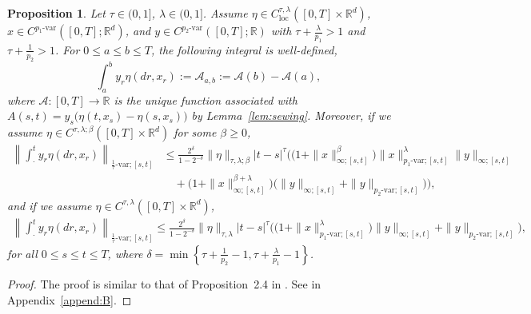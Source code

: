 \documentclass[11pt,reqno]{amsart}
\def\R{\mathbb R}
\newtheorem{proposition}{Proposition}[section]
\numberwithin{equation}{section}
\begin{document}
\begin{proposition}\label{prop:bounds}
Let $ \tau\in(0, 1]$, $ \lambda\in(0,1]$. 
Assume $\eta\in C^{\tau,\lambda}_{\mathrm{loc}}([0,T]\times \mathbb{R}^{d})$, $x\in C^{p_{1}\text{-}\mathrm{var}}([0,T];\mathbb{R}^{d})$, and $y\in C^{p_{2}\text{-}\mathrm{var}}([0,T];\mathbb{R})$ with $\tau +\frac{\lambda}{p_{1}}>1$  and $\tau + \frac{1}{p_{2}}>1$.  For $0\le a\le b\le T$, the following integral is well-defined,		
\[\int_{a}^{b} y_r \eta(dr,x_r) := \mathcal{A}_{a,b} := \mathcal A(b)-\mathcal A(a),\] 
where $\mathcal{A}:[0,T]\to \R$ is the unique function associated with $A(s,t)= y_s\big(\eta(t,x_s) - \eta(s,x_s)\big)$ by Lemma~\ref{lem:sewing}. Moreover, if we assume $\eta\in C^{\tau,\lambda;\beta}([0,T]\times\mathbb{R}^{d})$ for some $\beta\ge 0$, 
\begin{equation}\label{e:p-var2}
\begin{aligned}
\left\|\int_{\cdot}^{t}y_{r}\eta(dr,x_{r})\right\|_{\frac{1}{\tau}\text{-}\mathrm{var};[s,t]}&\le \frac{2^{\delta}}{1-2^{-\delta}}\|\eta\|_{\tau,\lambda;\beta} |t-s|^{\tau} \bigg(\Big(1+\|x\|^{\beta}_{\infty;[s,t]}\Big)\|x\|^{\lambda}_{p_{1}\text{-}\mathrm{var};[s,t]}\|y\|_{\infty;[s,t]}\\ 
&\quad +  \Big(1+\|x\|^{\beta+\lambda}_{\infty;[s,t]}\Big)\Big(\|y\|_{\infty;[s,t]}+\|y\|_{p_{2}\text{-}\mathrm{var};[s,t]}\Big)\bigg),
\end{aligned}
\end{equation}
and if we assume $\eta \in C^{\tau,\lambda}([0,T]\times\mathbb{R}^{d})$, 
\begin{equation}\label{e:p-var1}
\begin{aligned} 
\left\|\int_{\cdot}^{t}y_{r}\eta(dr,x_{r})\right\|_{\frac{1}{\tau}\text{-}\mathrm{var};[s,t]}\le \frac{2^{\delta}}{1-2^{-\delta}}\|\eta\|_{\tau,\lambda} |t-s|^{\tau} \bigg(\Big(1+\|x\|^{\lambda}_{p_{1}\text{-}\mathrm{var};[s,t]}\Big)\|y\|_{\infty;[s,t]} + \|y\|_{p_{2}\text{-}\mathrm{var};[s,t]} \bigg),
\end{aligned} 
\end{equation}
for all $0\le s\le t\le T$, where $\delta = \min\left\{\tau+\frac{1}{p_{2}}-1,\tau+\frac{\lambda}{p_{1}}-1\right\}$.
\end{proposition}

\begin{proof}
The proof is similar to that of Proposition~2.4 in \cite{HuLe}. See  in Appendix~\ref{append:B}.
\end{proof}
\end{document}
